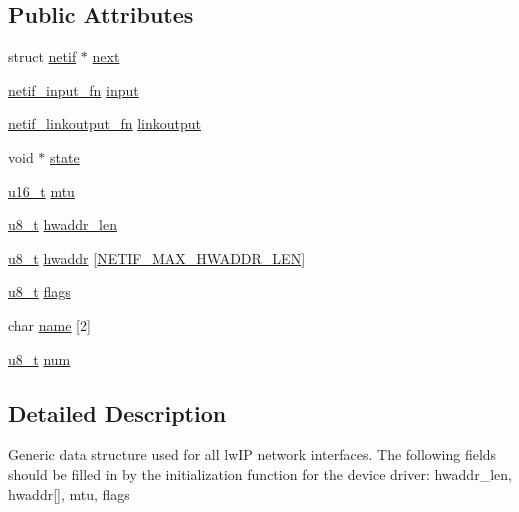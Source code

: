 \subsection*{Public Attributes}
\begin{DoxyCompactItemize}
\item 
struct \hyperlink{structnetif}{netif} $\ast$ \hyperlink{structnetif_af6c29611a8719fc99de967f60da71c8c}{next}
\item 
\hyperlink{openmote-cc2538_2lwip_2src_2include_2lwip_2netif_8h_ab2302b1b64ac7b95f24c6bab754a575e}{netif\+\_\+input\+\_\+fn} \hyperlink{structnetif_a8fe4f1b7b0d710216287da9615164a5c}{input}
\item 
\hyperlink{openmote-cc2538_2lwip_2src_2include_2lwip_2netif_8h_ab75e9d808bc1b788bea84213e6a111ed}{netif\+\_\+linkoutput\+\_\+fn} \hyperlink{structnetif_acaaac9b415a7be73eb8a287c8ed18a8d}{linkoutput}
\item 
void $\ast$ \hyperlink{structnetif_ad61510fed9cecbafc268ca0424dbd34e}{state}
\item 
\hyperlink{group__compiler__abstraction_ga77570ac4fcab86864fa1916e55676da2}{u16\+\_\+t} \hyperlink{structnetif_aca7d56b4e0f822b0ced2885f222b8d48}{mtu}
\item 
\hyperlink{group__compiler__abstraction_ga4caecabca98b43919dd11be1c0d4cd8e}{u8\+\_\+t} \hyperlink{structnetif_afe1181561cb16241f3cb5ed01e567d42}{hwaddr\+\_\+len}
\item 
\hyperlink{group__compiler__abstraction_ga4caecabca98b43919dd11be1c0d4cd8e}{u8\+\_\+t} \hyperlink{structnetif_aa6d410efeb59c69a881251a93b8abd1e}{hwaddr} \mbox{[}\hyperlink{openmote-cc2538_2lwip_2src_2include_2lwip_2netif_8h_ab887a8ec553de1be1d04cf2961c63c41}{N\+E\+T\+I\+F\+\_\+\+M\+A\+X\+\_\+\+H\+W\+A\+D\+D\+R\+\_\+\+L\+EN}\mbox{]}
\item 
\hyperlink{group__compiler__abstraction_ga4caecabca98b43919dd11be1c0d4cd8e}{u8\+\_\+t} \hyperlink{structnetif_a1c171db6097bbb6f09f63549a66e00ea}{flags}
\item 
char \hyperlink{structnetif_abd48227dcb80f70597ac0439126a0c2d}{name} \mbox{[}2\mbox{]}
\item 
\hyperlink{group__compiler__abstraction_ga4caecabca98b43919dd11be1c0d4cd8e}{u8\+\_\+t} \hyperlink{structnetif_ab7ef01e505dd2feb781fe86756b1c973}{num}
\end{DoxyCompactItemize}


\subsection{Detailed Description}
Generic data structure used for all lw\+IP network interfaces. The following fields should be filled in by the initialization function for the device driver\+: hwaddr\+\_\+len, hwaddr\mbox{[}\mbox{]}, mtu, flags 

